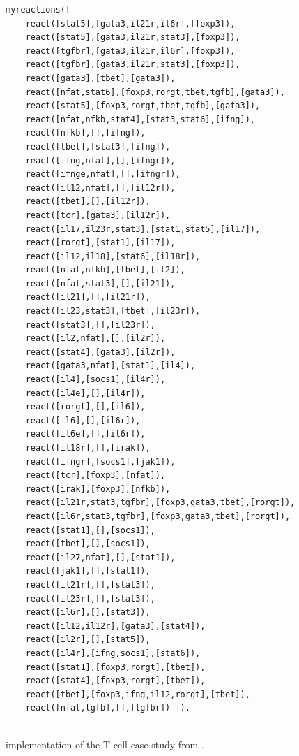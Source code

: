 \begin{figure}[t]
\begin{minipage}{0.9\linewidth}
\footnotesize
\begin{verbatim}
myreactions([
    react([stat5],[gata3,il21r,il6r],[foxp3]),
    react([stat5],[gata3,il21r,stat3],[foxp3]),
    react([tgfbr],[gata3,il21r,il6r],[foxp3]),
    react([tgfbr],[gata3,il21r,stat3],[foxp3]),
    react([gata3],[tbet],[gata3]),
    react([nfat,stat6],[foxp3,rorgt,tbet,tgfb],[gata3]),
    react([stat5],[foxp3,rorgt,tbet,tgfb],[gata3]),
    react([nfat,nfkb,stat4],[stat3,stat6],[ifng]),
    react([nfkb],[],[ifng]),
    react([tbet],[stat3],[ifng]),
    react([ifng,nfat],[],[ifngr]),
    react([ifnge,nfat],[],[ifngr]),
    react([il12,nfat],[],[il12r]),
    react([tbet],[],[il12r]),
    react([tcr],[gata3],[il12r]),
    react([il17,il23r,stat3],[stat1,stat5],[il17]),
    react([rorgt],[stat1],[il17]),
    react([il12,il18],[stat6],[il18r]),
    react([nfat,nfkb],[tbet],[il2]),
    react([nfat,stat3],[],[il21]),
    react([il21],[],[il21r]),
    react([il23,stat3],[tbet],[il23r]),
    react([stat3],[],[il23r]),
    react([il2,nfat],[],[il2r]),
    react([stat4],[gata3],[il2r]),
    react([gata3,nfat],[stat1],[il4]),
    react([il4],[socs1],[il4r]),
    react([il4e],[],[il4r]),
    react([rorgt],[],[il6]),
    react([il6],[],[il6r]),
    react([il6e],[],[il6r]),
    react([il18r],[],[irak]),
    react([ifngr],[socs1],[jak1]),
    react([tcr],[foxp3],[nfat]),
    react([irak],[foxp3],[nfkb]),
    react([il21r,stat3,tgfbr],[foxp3,gata3,tbet],[rorgt]),
    react([il6r,stat3,tgfbr],[foxp3,gata3,tbet],[rorgt]),
    react([stat1],[],[socs1]),
    react([tbet],[],[socs1]),
    react([il27,nfat],[],[stat1]),
    react([jak1],[],[stat1]),
    react([il21r],[],[stat3]),
    react([il23r],[],[stat3]),
    react([il6r],[],[stat3]),
    react([il12,il12r],[gata3],[stat4]),
    react([il2r],[],[stat5]),
    react([il4r],[ifng,socs1],[stat6]),
    react([stat1],[foxp3,rorgt],[tbet]),
    react([stat4],[foxp3,rorgt],[tbet]),
    react([tbet],[foxp3,ifng,il12,rorgt],[tbet]),
    react([nfat,tgfb],[],[tgfbr]) ]).
    
\end{verbatim}
\end{minipage}
\caption{\BioResolve implementation of the T cell case study from .}
\label{fig:bioresolve:tcell}
\end{figure}


